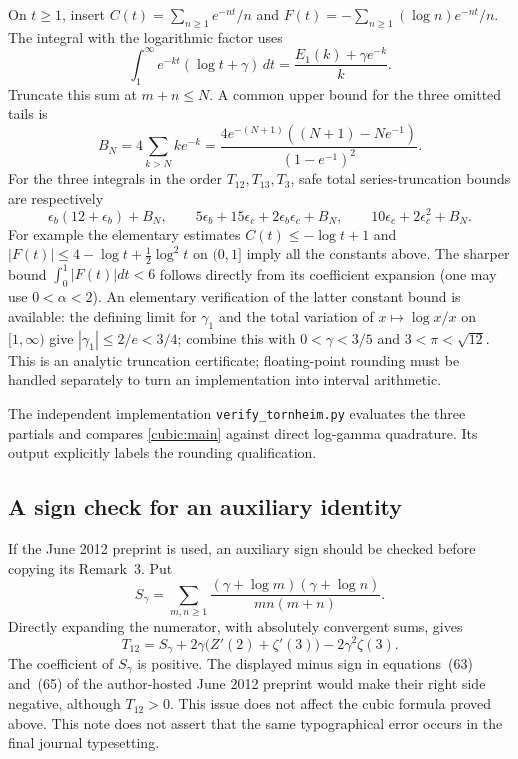 On $t\ge1$, insert
$C(t)=\sum_{n\ge1}e^{-nt}/n$ and
$F(t)=-\sum_{n\ge1}(\log n)e^{-nt}/n$.  The integral with the logarithmic
factor uses
\[
 \int_1^\infty e^{-kt}(\log t+\gamma)\,dt
 =\frac{E_1(k)+\gamma e^{-k}}k.
\]
Truncate this sum at $m+n\le N$.  A common upper bound for the three
omitted tails is
\[
 B_N=4\sum_{k>N}ke^{-k}
 =\frac{4e^{-(N+1)}((N+1)-Ne^{-1})}{(1-e^{-1})^2}.
\]
For the three integrals in the order $T_{12},T_{13},T_3$, safe total
series-truncation bounds are respectively
\[
 \epsilon_b(12+\epsilon_b)+B_N,\qquad
 5\epsilon_b+15\epsilon_c+2\epsilon_b\epsilon_c+B_N,\qquad
 10\epsilon_c+2\epsilon_c^2+B_N.
\]
For example the elementary estimates
$C(t)\le-\log t+1$ and
$|F(t)|\le4-\log t+\tfrac12\log^2t$ on $(0,1]$ imply all the constants
above.  The sharper bound $\int_0^1|F(t)|dt<6$ follows directly from its
coefficient expansion (one may use $0<\alpha<2$).
An elementary verification of the latter constant bound is available:
the defining limit for $\gamma_1$ and the total variation of
$x\mapsto\log x/x$ on $[1,\infty)$ give $|\gamma_1|\le2/e<3/4$;
combine this with $0<\gamma<3/5$ and $3<\pi<\sqrt{12}$.
This is an analytic truncation certificate; floating-point rounding must
be handled separately to turn an implementation into interval arithmetic.

The independent implementation \texttt{verify\_tornheim.py} evaluates the
three partials and compares \eqref{cubic:main} against direct log-gamma
quadrature.  Its output explicitly labels the rounding qualification.

\subsection{A sign check for an auxiliary identity}

If the June 2012 preprint is used, an auxiliary sign should be checked
before copying its Remark~3.  Put
\[
 S_\gamma=\sum_{m,n\ge1}
        \frac{(\gamma+\log m)(\gamma+\log n)}{mn(m+n)}.
\]
Directly expanding the numerator, with absolutely convergent sums, gives
\[
 T_{12}=S_\gamma+2\gamma\bigl(Z'(2)+\zeta'(3)\bigr)
                  -2\gamma^2\zeta(3).
\]
The coefficient of $S_\gamma$ is positive.  The displayed minus sign in
equations~(63) and~(65) of the author-hosted June 2012 preprint would make
their right side negative, although $T_{12}>0$.  This issue does not
affect the cubic formula proved above.  This note does not assert that
the same typographical error occurs in the final journal typesetting.

